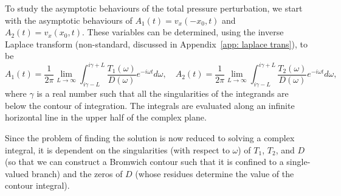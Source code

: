 \documentclass[12pt, draft]{../style-files/ociamthesis}
\begin{document}
To study the asymptotic behaviours of the total pressure perturbation, we start with the asymptotic behaviours of $A_1(t) = v_x(-x_0, t)$ and $A_2(t) = v_x(x_0, t)$. These variables can be determined, using the inverse Laplace transform (non-standard, discussed in Appendix~\ref{app: laplace trans}), to be
\begin{equation}
A_1(t) = \frac{1}{2\pi} \lim_{L \to \infty} \int_{i\gamma - L}^{i\gamma + L} \frac{T_1(\omega)}{D(\omega)} e^{-i\omega t} d\omega, \quad A_2(t) = \frac{1}{2\pi} \lim_{L \to \infty} \int_{i\gamma - L}^{i\gamma + L} \frac{T_2(\omega)}{D(\omega)} e^{-i\omega t} d\omega,
\label{A inv laplace}
\end{equation}
where $\gamma$ is a real number such that all the singularities of the integrands are below the contour of integration. The integrals are evaluated along an infinite horizontal line in the upper half of the complex plane.

Since the problem of finding the solution is now reduced to solving a complex integral, it is dependent on the singularities (with respect to $\omega$) of $T_1$, $T_2$, and $D$ (so that we can construct a Bromwich contour such that it is confined to a single-valued branch) and the zeros of $D$ (whose residues determine the value of the contour integral).
\end{document}
